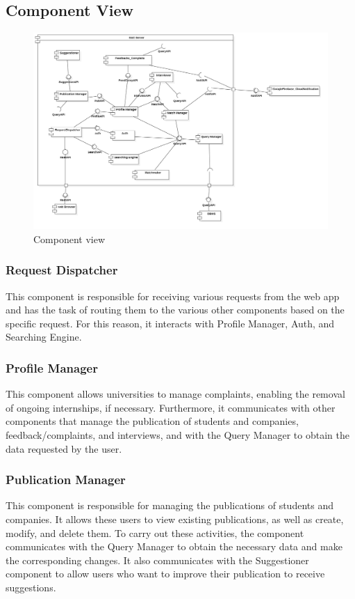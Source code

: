 \documentclass{article}
\begin{document}
\subsection{Component View}
\begin{figure}[H]
    \centering
    \includegraphics[width=1\linewidth]{ComponentDiagram.jpg}
    \caption{Component view}
    \label{fig:enter-label}
\end{figure}

\subsubsection{Request Dispatcher}
This component is responsible for receiving various requests from the web app and has the task of routing them to the various other components based on the specific request. For this reason, it interacts with Profile Manager, Auth, and Searching Engine. 

\subsubsection{Profile Manager}
This component allows universities to manage complaints, enabling the removal of ongoing internships, if necessary. \newline Furthermore, it communicates with other components that manage the publication of students and companies, feedback/complaints, and interviews, and with the Query Manager to obtain the data requested by the user.

\subsubsection{Publication Manager}
This component is responsible for managing the publications of students and companies. It allows these users to view existing publications, as well as create, modify, and delete them.  \newline
To carry out these activities, the component communicates with the Query Manager to obtain the necessary data and make the corresponding changes. It also communicates with the Suggestioner component to allow users who want to improve their publication to receive suggestions. 
\end{document}
